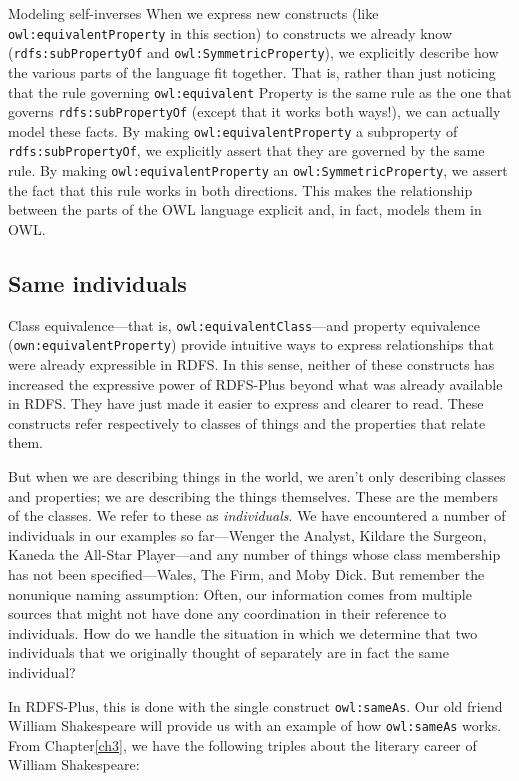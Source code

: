 \begin{challenge}{Modeling self-inverses}
When we express new constructs (like \texttt{owl:equivalentProperty} in this
section) to constructs we already know (\texttt{rdfs:subPropertyOf} and
\texttt{owl:SymmetricProperty}), we explicitly describe how the various parts of
the language fit together. That is, rather than just noticing that the
rule governing \texttt{owl:equivalent} Property is the same rule as the one that
governs \texttt{rdfs:subPropertyOf} (except that it works both ways!), we can
actually model these facts. By making \texttt{owl:equivalentProperty} a
subproperty of \texttt{rdfs:subPropertyOf}, we explicitly assert that they are
governed by the same rule. By making \texttt{owl:equivalentProperty} an
\texttt{owl:SymmetricProperty}, we assert the fact that this rule
works in both directions. This makes the relationship between the parts
of the OWL language explicit and, in fact, models them in OWL.

\subsection{Same individuals}

Class equivalence---that is, \texttt{owl:equivalentClass}---and property
equivalence (\texttt{own:equivalentProperty}) provide intuitive ways to express
relationships that were already expressible in RDFS. In this sense,
neither of these constructs has increased the expressive power of
RDFS-Plus beyond what was already available in RDFS. They have just made
it easier to express and clearer to read. These constructs refer
respectively to classes of things and the properties that relate them.

But when we are describing things in the world, we aren't only
describing classes and properties; we are describing the things
themselves. These are the members of the classes. We refer to these as
\emph{individuals}. We have encountered a number of individuals in our examples
so far---Wenger the Analyst, Kildare the Surgeon, Kaneda the All-Star
Player---and any number of things whose class membership has not been
specified---Wales, The Firm, and Moby Dick. But remember the nonunique
naming assumption: Often, our information comes from multiple sources
that might not have done any coordination in their reference to
individuals. How do we handle the situation in which we determine that
two individuals that we originally thought of separately are in fact the
same individual?

In RDFS-Plus, this is done with the single construct \texttt{owl:sameAs}. Our old
friend William Shakespeare will provide us with an example of how
\texttt{owl:sameAs} works. From Chapter\ref{ch3}, we have the following triples about
the literary career of William Shakespeare:


\end{challenge}
